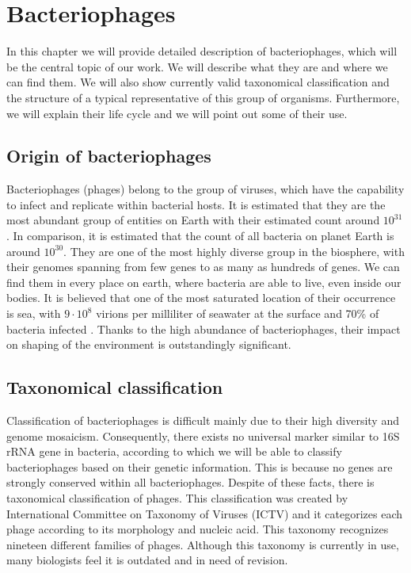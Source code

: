 \chapter{Bacteriophages}
In this chapter we will provide detailed description of bacteriophages, which will be the central topic of our work.
We will describe what they are and where we can find them.
We will also show currently valid taxonomical classification and the structure of a typical representative of this group of organisms.
Furthermore, we will explain their life cycle and we will point out some of their use.

\section{Origin of bacteriophages}
Bacteriophages (phages) belong to the group of viruses, which have the capability to infect and replicate within bacterial hosts.
It is estimated that they are the most abundant group of entities on Earth with their estimated count around $10^{31}$\cite{phage}.
In comparison, it is estimated that the count of all bacteria on planet Earth is around $10^{30}$.
They are one of the most highly diverse group in the biosphere, with their genomes spanning from few genes to as many as hundreds of genes.
We can find them in every place on earth, where bacteria are able to live, even inside our bodies.
It is believed that one of the most saturated location of their occurrence is sea, with  $9\cdot 10^8$ virions per milliliter of seawater at the surface and 70\% of bacteria infected \cite{virioplankton}.
Thanks to the high abundance of bacteriophages, their impact on shaping of the environment is outstandingly significant.

\section{Taxonomical classification}
Classification of bacteriophages is difficult mainly due to their high diversity and genome mosaicism. \cite{phagetax}
Consequently, there exists no universal marker similar to 16S rRNA gene in bacteria, according to which we will be able to classify bacteriophages based on their genetic information.
This is because no genes are strongly conserved within all bacteriophages.
Despite of these facts, there is taxonomical classification of phages.
This classification was created by International Committee on Taxonomy of Viruses (ICTV) and it categorizes each phage according to its morphology and nucleic acid.
This taxonomy recognizes nineteen different families of phages.
Although this taxonomy is currently in use, many biologists feel it is outdated and in need of revision. \cite{phagetax}

